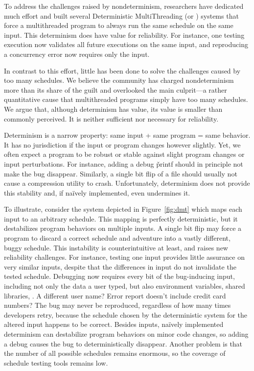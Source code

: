 To address the challenges raised by nondeterminism, researchers have dedicated
much effort and built several Deterministic MultiThreading (or \dmt) systems
that force a multithreaded program to always run the same schedule on the same
input.  This determinism does have value for reliability.  For instance, one
testing execution now validates all future executions on the same input, and 
reproducing a concurrency error now requires only the input.

In contrast to this effort, little has been done to solve the
challenges caused by too many schedules.  We believe
the community has charged nondeterminism more than its share of the guilt
and overlooked the main culprit---a rather quantitative cause that
multithreaded programs simply have too many schedules.
We argue that, although determinism has value, its value
is smaller than commonly perceived.  It is neither sufficient nor
necessary for reliability.

 Determinism is a
narrow property: same input + same program = same behavior. It has no
jurisdiction if the input or program changes however slightly.  Yet, we
often expect a program to be robust or stable against slight program
changes or input perturbations.  For instance, adding a debug \v{printf}
should in principle not make the bug disappear.  Similarly, a single bit flip of
a file should usually not cause a compression utility to crash. Unfortunately,
determinism does not provide this stability and, if na\"{i}vely implemented,
even undermines it.

To illustrate, consider the system depicted in
Figure~\ref{fig:dmt} which maps each input to an arbitrary schedule. This
mapping is perfectly deterministic, but it destabilizes program
behaviors on multiple inputs.  A single bit flip may force a program to
discard a correct schedule and adventure into a vastly different, buggy
schedule. This instability is counterintuitive at least,
and raises new reliability challenges.  For instance, testing one input
provides little assurance on very similar inputs, despite that the differences
in input do not invalidate the tested schedule.  Debugging now requires
every bit of the bug-inducing input, including not only the data a user
typed, but also environment variables, shared libraries, \etc.  A
different user name?  Error report doesn't include credit card numbers?
The bug may never be reproduced, regardless of how many times developers
retry, because the schedule chosen by the deterministic system for the
altered input happens to be correct. Besides inputs, na\"{i}vely implemented
determinism can destabilize program behaviors on minor code changes, so adding a
debug  causes the bug to deterministically disappear.  Another
problem is that the number of all possible schedules remains enormous, so the
coverage of schedule testing tools remains low.

